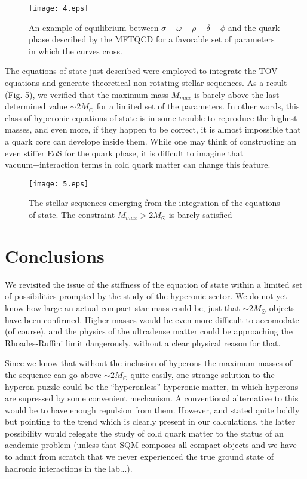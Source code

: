 \documentclass[a4paper]{jpconf}
\begin{document}
\begin{figure}[h]
\texttt{[image: 4.eps]}\hspace{2pc}%
\begin{minipage}[b]{14pc}\caption{\label{label}An example of equilibrium between $\sigma - \omega - \rho - \delta - \phi$ and the quark phase described by the MFTQCD for a favorable 
set of parameters in which the curves cross.}
\end{minipage}
\end{figure}

The equations of state just described were employed to integrate the TOV equations and generate theoretical non-rotating stellar sequences. As a 
result (Fig. 5), we verified that the maximum mass $M_{max}$ is barely above the last determined value $\sim 2 M_{\odot}$ for a limited set of the 
parameters. In other words, this class of hyperonic equations of state is in some trouble to reproduce the highest masses, and even more, if they happen 
to be correct, it is almost impossible that a quark core can develope inside them. While one may think of constructing an even stiffer EoS for the 
quark phase, it is diffcult to imagine that vacuum+interaction terms in cold quark matter can change this feature.

\begin{figure}[h]
\texttt{[image: 5.eps]}\hspace{2pc}%
\begin{minipage}[b]{14pc}\caption{\label{label}The stellar sequences emerging from the integration of the equations of state. The constraint $M_{max} > 2 M_{\odot}$ is barely satisfied }
\end{minipage}
\end{figure}

\section{Conclusions}

We revisited the issue of the stiffness of the equation of state within a limited set of possibilities prompted by the study of the hyperonic sector.
We do not yet know how large an actual compact star mass could be, just that $\sim 2 M_{\odot}$ objects have been confirmed. Higher masses 
would be even more difficult to accomodate (of course), and the physics of the ultradense matter could be approaching the Rhoades-Ruffini limit 
dangerously, without a clear physical reason for that.

Since we know that without the inclusion of hyperons the maximum masses of the sequence can go above $\sim 2 M_{\odot}$ quite easily, 
one strange solution to the hyperon puzzle could be the ``hyperonless'' hyperonic matter, in which hyperons are supressed by some convenient 
mechanism. A conventional alternative to this would be to have enough repulsion from them. However, and stated quite boldly but pointing to the 
trend which is clearly present in our calculations, the latter 
possibility would relegate the study of cold quark matter to the status of an academic problem (unless that SQM composes all compact 
objects and we have to admit from scratch that we never experienced the true ground state of hadronic interactions in the lab...).
\end{document}

